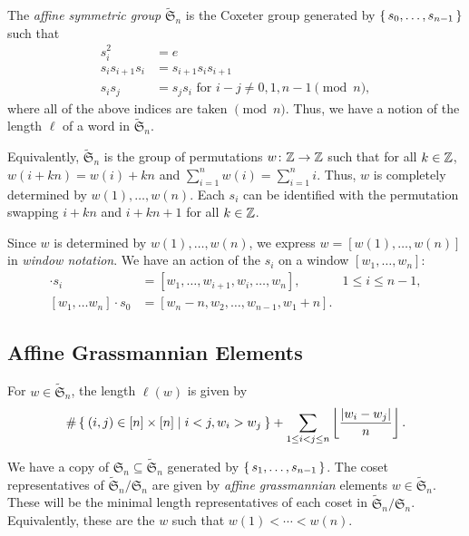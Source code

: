 \documentclass[letterpaper]{article}
\newcommand*\affS{\widetilde{\mathfrak{S}}}
\begin{document}
\begin{defn}
  The \emph{affine symmetric group} $\affS_n$ is the Coxeter group generated by $\set{s_0, \ldots, s_{n - 1}}$ such that
  \begin{align*}
    s_i^2 &= e \\
    s_i s_{i + 1} s_i &= s_{i + 1} s_i s_{i + 1} \\
    s_i s_j &= s_j s_i \text{ for } i - j \neq 0, 1, n - 1 \pmod{n},
  \end{align*}
  where all of the above indices are taken $\pmod{n}$.
  Thus, we have a notion of the length $\ell$ of a word in $\affS_n$.

  Equivalently, $\affS_n$ is the group of permutations $w\colon \mathbb{Z} \to \mathbb{Z}$ such that for all $k \in \mathbb{Z}$, $w(i + kn) = w(i) + kn$ and $\sum_{i = 1}^n w(i) = \sum_{i = 1}^n i$.
  Thus, $w$ is completely determined by $w(1), \ldots, w(n)$.
  Each $s_i$ can be identified with the permutation swapping $i + kn$ and $i + kn + 1$ for all $k \in \mathbb{Z}$.

  Since $w$ is determined by $w(1), \ldots, w(n)$, we express $w = [w(1), \ldots, w(n)]$ in \emph{window notation}.
  We have an action of the $s_i$ on a window $[w_1, \ldots, w_n]$:
  \begin{align*}
    [w_1, \ldots w_n] \cdot s_i &= [w_1, \ldots, w_{i + 1}, w_i, \ldots, w_n], & 1 \leq i \leq n - 1, \\
    [w_1, \ldots w_n] \cdot s_0 &= [w_n - n, w_2, \ldots, w_{n - 1}, w_1 + n]. &
  \end{align*}
\end{defn}

\subsection{Affine Grassmannian Elements}

\begin{prop}
  For $w \in \affS_n$, the length $\ell(w)$ is given by
  \[
    \#\Set{(i, j) \in [n] \times [n] | i < j, w_i > w_j} + \sum_{1 \leq i < j\leq n} \left\lfloor \frac{\abs{w_i - w_j}}{n} \right\rfloor.
  \]
\end{prop}

\begin{defn}
  We have a copy of $\mathfrak{S}_n \subseteq \affS_n$ generated by $\set{s_1, \ldots, s_{n - 1}}$.
  The coset representatives of $\affS_n / \mathfrak{S}_n$ are given by \emph{affine grassmannian} elements $w \in \affS_n$.
  These will be the minimal length representatives of each coset in $\affS_n / \mathfrak{S}_n$.
  Equivalently, these are the $w$ such that $w(1) < \cdots < w(n)$.
\end{defn}
\end{document}
